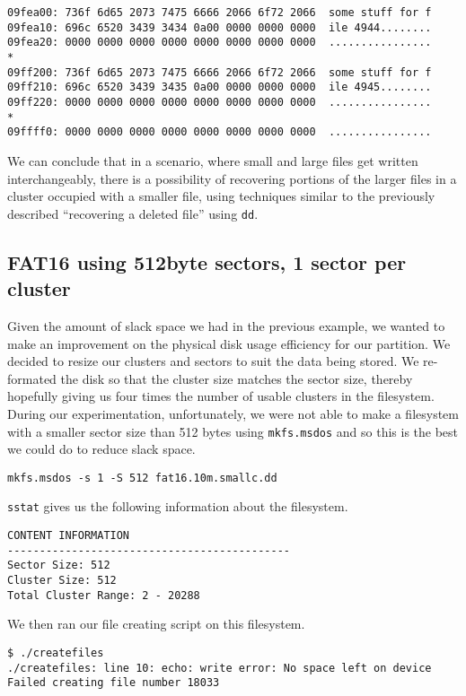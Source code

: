 \documentclass[a4paper,
    11pt,
    normalheadings,
    parindent,
    UKenglish,
    abstracton,
    ]{scrartcl}
\begin{document}
\begin{verbatim}
09fea00: 736f 6d65 2073 7475 6666 2066 6f72 2066  some stuff for f
09fea10: 696c 6520 3439 3434 0a00 0000 0000 0000  ile 4944........
09fea20: 0000 0000 0000 0000 0000 0000 0000 0000  ................
*
09ff200: 736f 6d65 2073 7475 6666 2066 6f72 2066  some stuff for f
09ff210: 696c 6520 3439 3435 0a00 0000 0000 0000  ile 4945........
09ff220: 0000 0000 0000 0000 0000 0000 0000 0000  ................
*
09ffff0: 0000 0000 0000 0000 0000 0000 0000 0000  ................
\end{verbatim}

We can conclude that in a scenario, where small and large files get written interchangeably, there is a possibility of recovering portions of the larger files in a cluster occupied with a smaller file, using techniques similar to the previously described ``recovering a deleted file'' using \texttt{dd}.


\subsection{FAT16 using 512byte sectors, 1 sector per cluster}

Given the amount of slack space we had in the previous example, we wanted to make an improvement on the  physical disk usage efficiency for our partition. We decided to resize our clusters and sectors to suit the data being stored. We re-formated the disk so that the cluster size matches the sector size, thereby hopefully giving us four times the number of usable clusters in the filesystem. During our experimentation, unfortunately, we were not able to make a filesystem with a smaller sector size than 512 bytes using \texttt{mkfs.msdos} and so this is the best we could do to reduce slack space.

\begin{verbatim}
mkfs.msdos -s 1 -S 512 fat16.10m.smallc.dd
\end{verbatim}

\texttt{sstat} gives us the following information about the filesystem.
\begin{verbatim}
CONTENT INFORMATION
--------------------------------------------
Sector Size: 512
Cluster Size: 512
Total Cluster Range: 2 - 20288
\end{verbatim}

We then ran our file creating script on this filesystem.
\begin{verbatim}
$ ./createfiles 
./createfiles: line 10: echo: write error: No space left on device
Failed creating file number 18033
\end{verbatim}
\end{document}
